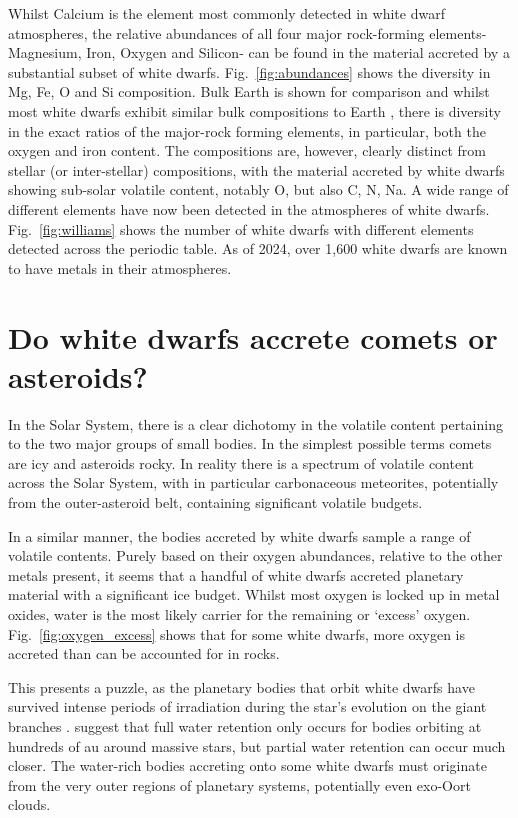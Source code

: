 \documentclass[onecolumn,authoryear]{els-mrw}
\begin{document}
Whilst Calcium is the element most commonly detected in white dwarf atmospheres, the relative abundances of all four major rock-forming elements- Magnesium, Iron, Oxygen and Silicon- can be found in the material accreted by a substantial subset of white dwarfs. Fig.~\ref{fig:abundances} shows the diversity in Mg, Fe, O and Si composition. Bulk Earth is shown for comparison and whilst most white dwarfs exhibit similar bulk compositions to Earth \citep{Trierweiler2023}, there is diversity in the exact ratios of the major-rock forming elements, in particular, both the oxygen and iron content. The compositions are, however, clearly distinct from stellar (or inter-stellar) compositions, with the material accreted by white dwarfs showing sub-solar volatile content, notably O, but also C, N, Na. A wide range of different elements have now been detected in the atmospheres of white dwarfs. Fig.~\ref{fig:williams} shows the number of  white dwarfs with different elements detected across the periodic table. As of 2024, over 1,600 white dwarfs are known to have metals in their atmospheres. 




\section{Do white dwarfs accrete comets or asteroids?}
In the Solar System, there is a clear dichotomy in the volatile content pertaining to the two major groups of small bodies. In the simplest possible terms comets are icy and asteroids rocky. In reality there is a spectrum of volatile content across the Solar System, with in particular carbonaceous meteorites, potentially from the outer-asteroid belt, containing significant volatile budgets. 

In a similar manner, the bodies accreted by white dwarfs sample a range of volatile contents. Purely based on their oxygen abundances, relative to the other metals present, it seems that a handful of white dwarfs accreted planetary material with a significant ice budget. Whilst most oxygen is locked up in metal oxides, water is the most likely carrier for the remaining or `excess' oxygen. Fig.~\ref{fig:oxygen_excess} shows that for some white dwarfs, more oxygen is accreted than can be accounted for in rocks. 

This presents a puzzle, as the planetary bodies that orbit white dwarfs have survived intense periods of irradiation during the star's evolution on the giant branches \citep{jura2010}. \cite{Malamud2017} suggest that full water retention only occurs for bodies orbiting at hundreds of au around massive stars, but partial water retention can occur much closer. The water-rich bodies accreting onto some white dwarfs must originate from the very outer regions of planetary systems, potentially even exo-Oort clouds. 
\end{document}
